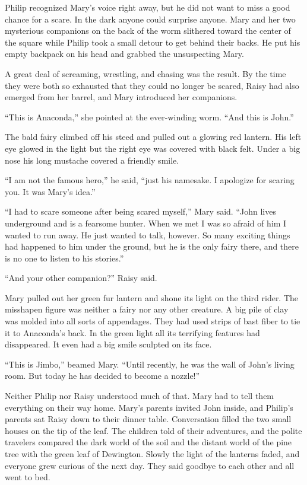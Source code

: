 \documentclass[10pt]{memoir}
\begin{document}
Philip recognized Mary's voice right away, but he did not want to miss a good
chance for a scare. In the dark anyone could surprise anyone. Mary and her two
mysterious companions on the back of the worm slithered toward the center of
the square while Philip took a small detour to get behind their backs. He put
his empty backpack on his head and grabbed the unsuspecting Mary.

A great deal of screaming, wrestling, and chasing was the result. By the time
they were both so exhausted that they could no longer be scared, Raisy had also
emerged from her barrel, and Mary introduced her companions.

``This is Anaconda,'' she pointed at the ever-winding worm. ``And this is
John.''

The bald fairy climbed off his steed and pulled out a glowing red lantern.
His left eye glowed in the light but the right eye was covered with black felt.
Under a big nose his long mustache covered a friendly smile.

``I am not the famous hero,'' he said, ``just his namesake. I apologize for
scaring you. It was Mary's idea.''

``I had to scare someone after being scared myself,'' Mary said. ``John lives
underground and is a fearsome hunter. When we met I was so afraid of him I
wanted to run away. He just wanted to talk, however. So many exciting things
had happened to him under the ground, but he is the only fairy there, and there
is no one to listen to his stories.''

``And your other companion?'' Raisy said.

Mary pulled out her green fur lantern and shone its light on the third rider.
The misshapen figure was neither a fairy nor any other creature. A big pile of
clay was molded into all sorts of appendages. They had used strips of bast
fiber to tie it to Anaconda's back. In the green light all its terrifying
features had disappeared. It even had a big smile sculpted on its face.

``This is Jimbo,'' beamed Mary. ``Until recently, he was the wall of John's
living room. But today he has decided to become a nozzle!''

Neither Philip nor Raisy understood much of that. Mary had to tell them
everything on their way home. Mary's parents invited John inside, and Philip's
parents sat Raisy down to their dinner table. Conversation filled the two small
houses on the tip of the leaf. The children told of their adventures, and the
polite travelers compared the dark world of the soil and the distant world of
the pine tree with the green leaf of Dewington. Slowly the light of the
lanterns faded, and everyone grew curious of the next day. They said goodbye to
each other and all went to bed.
\end{document}
